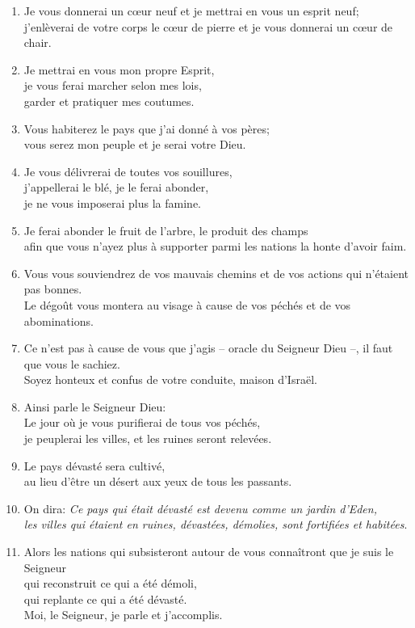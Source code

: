 \documentclass[12pt,a4paper,titlepage]{article}
\def \pslabelsep{0.2em} %
\def \psleftmargin{0em} %
\begin{document}
\begin{enumerate}[leftmargin=\psleftmargin, labelsep = \pslabelsep, label={\arabic*}, font=\color{\pscolor}\small\textsuperscript, parsep=0em, itemsep=0em, topsep=0em ]
\item Je vous donnerai un cœur neuf et je mettrai en vous un esprit neuf; \\ j’enlèverai de votre corps le cœur de pierre et je vous donnerai un cœur de chair.
\item Je mettrai en vous mon propre Esprit, \\ je vous ferai marcher selon mes lois, \\ garder et pratiquer mes coutumes.
\item Vous habiterez le pays que j’ai donné à vos pères; \\ vous serez mon peuple et je serai votre Dieu.
\item Je vous délivrerai de toutes vos souillures, \\ j’appellerai le blé, je le ferai abonder, \\ je ne vous imposerai plus la famine.
\item Je ferai abonder le fruit de l’arbre, le produit des champs \\ afin que vous n’ayez plus à supporter parmi les nations la honte d’avoir faim.
\item Vous vous souviendrez de vos mauvais chemins et de vos actions qui n’étaient pas bonnes. \\ Le dégoût vous montera au visage à cause de vos péchés et de vos abominations.
\item Ce n’est pas à cause de vous que j’agis – oracle du Seigneur Dieu –, il faut que vous le sachiez. \\ Soyez honteux et confus de votre conduite, maison d’Israël. \parSpace
\item Ainsi parle le Seigneur Dieu: \\ Le jour où je vous purifierai de tous vos péchés, \\ je peuplerai les villes, et les ruines seront relevées.
\item Le pays dévasté sera cultivé, \\ au lieu d’être un désert aux yeux de tous les passants.
\item On dira: \og{}\emph{Ce pays qui était dévasté est devenu comme un jardin d’Eden, \\ les villes qui étaient en ruines, dévastées, démolies, sont fortifiées et habitées}.\fg{}
\item Alors les nations qui subsisteront autour de vous connaîtront que je suis le Seigneur \\ qui reconstruit ce qui a été démoli, \\ qui replante ce qui a été dévasté. \\ Moi, le Seigneur, je parle et j’accomplis. \parSpace

\end{enumerate}
\end{document}
